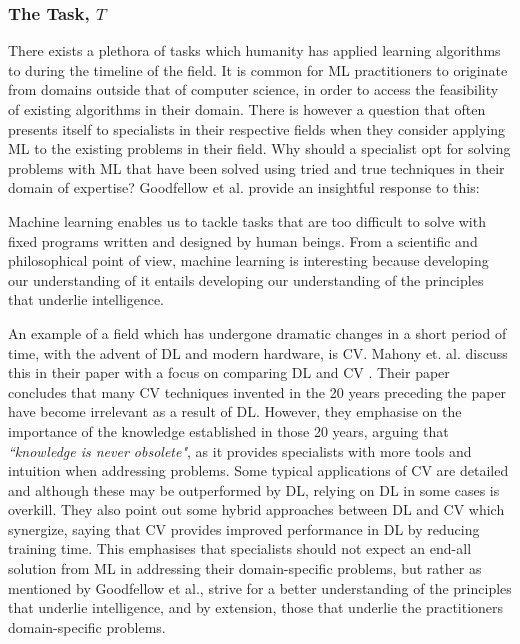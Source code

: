 \subsubsection{The Task, $T$}
There exists a plethora of tasks which humanity has applied learning algorithms
to during the timeline of the field. It is common for \gls{ML} practitioners to
originate from domains outside that of computer science, in order to access the
feasibility of existing algorithms in their domain. There is however a question
that often presents itself to specialists in their respective fields when they
consider applying \gls{ML} to the existing problems in their field. Why should a
specialist opt for solving problems with \gls{ML} that have been solved using
tried and true techniques in their domain of expertise? Goodfellow et al.
\cite{Goodfellow-et-al-2016} provide an insightful response to this:

\begin{fancyquotes}
    Machine learning enables us to tackle tasks that are too difficult
    to solve with fixed programs written and designed by human beings. From a
    scientific and philosophical point of view, machine learning is interesting
    because developing our understanding of it entails developing our
    understanding of the principles that underlie intelligence.
\end{fancyquotes}

An example of a field which has undergone dramatic changes in a short period of
time, with the advent of \gls{DL} and modern hardware, is \gls{CV}. Mahony et.
al. discuss this in their paper with a focus on comparing \gls{DL} and \gls{CV}
\cite{Mahony-et-al-2020}. Their paper concludes that many \gls{CV} techniques
invented in the 20 years preceding the paper have become irrelevant as a result
of \gls{DL}. However, they emphasise on the importance of the knowledge
established in those 20 years, arguing that \textit{``knowledge is never
obsolete"}, as it provides specialists with more tools and intuition when
addressing problems. Some typical applications of \gls{CV} are detailed and
although these may be outperformed by \gls{DL}, relying on \gls{DL} in some
cases is overkill. They also point out some hybrid approaches between \gls{DL}
and \gls{CV} which synergize, saying that \gls{CV} provides improved performance
in \gls{DL} by reducing training time. This emphasises that specialists should
not expect an end-all solution from \gls{ML} in addressing their domain-specific
problems, but rather as mentioned by Goodfellow et al., strive for a better
understanding of the principles that underlie intelligence, and by extension,
those that underlie the practitioners domain-specific problems.

